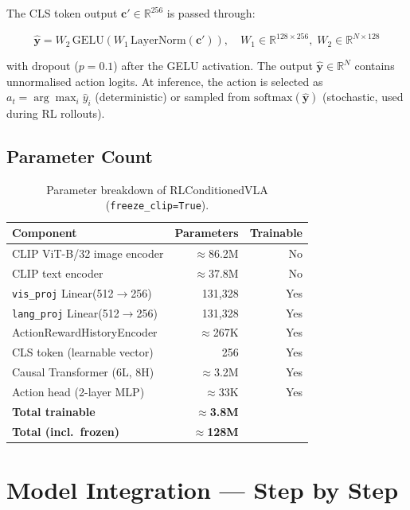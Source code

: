 \documentclass[12pt, a4paper]{article}
\begin{document}
The CLS token output $\mathbf{c}' \in \mathbb{R}^{256}$ is passed through:

\[
  \hat{\mathbf{y}} = W_2\,\mathrm{GELU}\!\left(W_1\,\mathrm{LayerNorm}(\mathbf{c}')\right),
  \quad W_1 \in \mathbb{R}^{128\times256},\; W_2 \in \mathbb{R}^{N\times128}
\]

with dropout ($p=0.1$) after the GELU activation.
The output $\hat{\mathbf{y}} \in \mathbb{R}^{N}$ contains unnormalised action
logits.
At inference, the action is selected as $a_t = \arg\max_i \hat{y}_i$
(deterministic) or sampled from $\mathrm{softmax}(\hat{\mathbf{y}})$ (stochastic,
used during RL rollouts).

\subsection{Parameter Count}

\begin{table}[h]
\centering
\caption{Parameter breakdown of RLConditionedVLA (\texttt{freeze\_clip=True}).}
\begin{tabular}{L{6cm} r r}
\toprule
\textbf{Component} & \textbf{Parameters} & \textbf{Trainable} \\
\midrule
CLIP ViT-B/32 image encoder  & $\approx$86.2M & No  \\
CLIP text encoder             & $\approx$37.8M & No  \\
\texttt{vis\_proj}  Linear(512$\to$256) & 131,328  & Yes \\
\texttt{lang\_proj} Linear(512$\to$256) & 131,328  & Yes \\
ActionRewardHistoryEncoder    & $\approx$267K  & Yes \\
CLS token (learnable vector)  & 256            & Yes \\
Causal Transformer (6L, 8H)   & $\approx$3.2M  & Yes \\
Action head (2-layer MLP)     & $\approx$33K   & Yes \\
\midrule
\textbf{Total trainable}  & \textbf{$\approx$3.8M}  & \\
\textbf{Total (incl.\ frozen)} & \textbf{$\approx$128M} & \\
\bottomrule
\end{tabular}
\end{table}

\newpage

\section{Model Integration — Step by Step}
\label{sec:integration}
\end{document}
